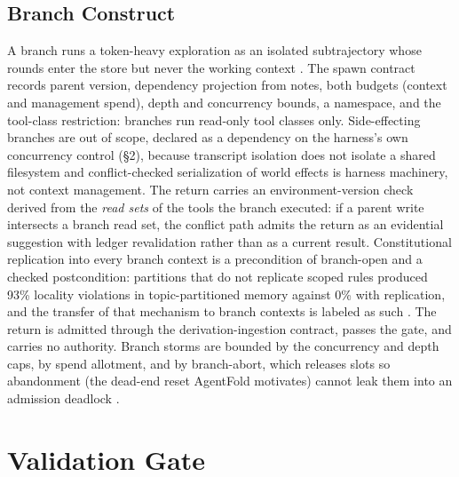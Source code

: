 \documentclass[11pt]{article}
\begin{document}
\subsection{Branch Construct}
\label{sec:branch}
A branch runs a token-heavy exploration as an isolated subtrajectory whose rounds enter the store but never the working context \cite{folding2026,dream2026}. The spawn contract records parent version, dependency projection from notes, both budgets (context and management spend), depth and concurrency bounds, a namespace, and the tool-class restriction: branches run read-only tool classes only. Side-effecting branches are out of scope, declared as a dependency on the harness's own concurrency control (\S2), because transcript isolation does not isolate a shared filesystem and conflict-checked serialization of world effects is harness machinery, not context management. The return carries an environment-version check derived from the \emph{read sets} of the tools the branch executed: if a parent write intersects a branch read set, the conflict path admits the return as an evidential suggestion with ledger revalidation rather than as a current result. Constitutional replication into every branch context is a precondition of branch-open and a checked postcondition: partitions that do not replicate scoped rules produced 93\% locality violations in topic-partitioned memory against 0\% with replication, and the transfer of that mechanism to branch contexts is labeled as such \cite{cliff2026}. The return is admitted through the derivation-ingestion contract, passes the gate, and carries no authority. Branch storms are bounded by the concurrency and depth caps, by spend allotment, and by branch-abort, which releases slots so abandonment (the dead-end reset AgentFold motivates) cannot leak them into an admission deadlock \cite{agentfold2026}.

\section{Validation Gate}
\label{sec:gate}
\end{document}
